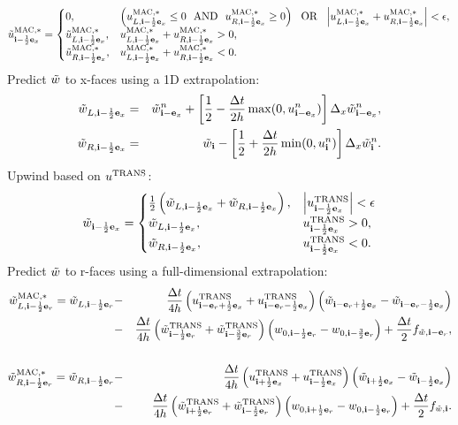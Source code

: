 \begin{equation}
\tilde{u}_{{\bf i}-\frac{1}{2}{\bf e}_x}^{\rm MAC,*} =
\begin{cases}
0, & \left(u_{L,{\bf i}-\frac{1}{2}{\bf e}_x}^{\rm MAC,*} \le 0 ~~ {\rm AND} ~~ u_{R,{\bf i}-\frac{1}{2}{\bf e}_x}^{\rm MAC,*} \ge 0\right) ~~ {\rm OR} ~~ \left|u_{L,{\bf i}-\frac{1}{2}{\bf e}_x}^{\rm MAC,*} + u_{R,{\bf i}-\frac{1}{2}{\bf e}_x}^{\rm MAC,*}\right| < \epsilon, \\
\tilde{u}_{L,{\bf i}-\frac{1}{2}{\bf e}_x}^{\rm MAC,*}, & u_{L,{\bf i}-\frac{1}{2}{\bf e}_x}^{\rm MAC,*} + u_{R,{\bf i}-\frac{1}{2}{\bf e}_x}^{\rm MAC,*} > 0, \\
\tilde{u}_{R,{\bf i}-\frac{1}{2}{\bf e}_x}^{\rm MAC,*}, & u_{L,{\bf i}-\frac{1}{2}{\bf e}_x}^{\rm MAC,*} + u_{R,{\bf i}-\frac{1}{2}{\bf e}_x}^{\rm MAC,*} < 0. 
\end{cases}
\end{equation}
Predict $\tilde{w}$ to x-faces using a 1D extrapolation:
\begin{eqnarray}
\tilde{w}_{L,{\bf i}-\frac{1}{2}{\bf e}_x} &=& \tilde{w}_{{\bf i}-{\bf e}_x}^n + \left[\frac{1}{2} - \frac{\Delta t}{2h}\max(0,u_{{\bf i}-{\bf e}_x}^n)\right]\Delta_x \tilde{w}_{{\bf i}-{\bf e}_x}^n, \\
\tilde{w}_{R,{\bf i}-\frac{1}{2}{\bf e}_x} &=& \tilde{w}_{{\bf i}} - \left[\frac{1}{2} + \frac{\Delta t}{2h}\min(0,u_{{\bf i}}^n)\right]\Delta_x \tilde{w}_{{\bf i}}^n.
\end{eqnarray}
Upwind based on $u^{\rm TRANS}$:
\begin{equation}
\tilde{w}_{{\bf i}-\frac{1}{2}{\bf e}_x} =
\begin{cases}
\frac{1}{2}\left(\tilde{w}_{L,{\bf i}-\frac{1}{2}{\bf e}_x} + \tilde{w}_{R,{\bf i}-\frac{1}{2}{\bf e}_x}\right), & \left|u^{\rm TRANS}_{{\bf i}-\frac{1}{2}{\bf e}_x}\right| < \epsilon \\
\tilde{w}_{L,{\bf i}-\frac{1}{2}{\bf e}_x}, & u^{\rm TRANS}_{{\bf i}-\frac{1}{2}{\bf e}_x} > 0, \\
\tilde{w}_{R,{\bf i}-\frac{1}{2}{\bf e}_x}, & u^{\rm TRANS}_{{\bf i}-\frac{1}{2}{\bf e}_x} < 0. \\
\end{cases}
\end{equation}
Predict $\tilde{w}$ to r-faces using a full-dimensional extrapolation:
\begin{eqnarray}
\tilde{w}_{L,{\bf i}-\frac{1}{2}{\bf e}_r}^{\rm MAC,*} = \tilde{w}_{L,{\bf i}-\frac{1}{2}{\bf e}_r} &-& \frac{\Delta t}{4h}\left(u_{{\bf i}-{\bf e}_r+\frac{1}{2}{\bf e}_x}^{\rm TRANS}+u_{{\bf i}-{\bf e}_r-\frac{1}{2}{\bf e}_x}^{\rm TRANS}\right)\left(\tilde{w}_{{\bf i}-{\bf e}_r+\frac{1}{2}{\bf e}_x} - \tilde{w}_{{\bf i}-{\bf e}_r-\frac{1}{2}{\bf e}_x}\right) \nonumber \\
&-& \frac{\Delta t}{4h}\left(\tilde{w}_{{\bf i}-\frac{1}{2}{\bf e}_r}^{\rm TRANS}+\tilde{w}_{{\bf i}-\frac{3}{2}{\bf e}_r}^{\rm TRANS}\right)\left(w_{0,{\bf i}-\frac{1}{2}{\bf e}_r} - w_{0,{\bf i}-\frac{3}{2}{\bf e}_r}\right) + \frac{\Delta t}{2}f_{\tilde{w},{\bf i}-{\bf e}_r}, \nonumber \\
&& \\
\tilde{w}_{R,{\bf i}-\frac{1}{2}{\bf e}_r}^{\rm MAC,*} = \tilde{w}_{R,{\bf i}-\frac{1}{2}{\bf e}_r} &-& \frac{\Delta t}{4h}\left(u_{{\bf i}+\frac{1}{2}{\bf e}_x}^{\rm TRANS}+u_{{\bf i}-\frac{1}{2}{\bf e}_x}^{\rm TRANS}\right)\left(\tilde{w}_{{\bf i}+\frac{1}{2}{\bf e}_x} - \tilde{w}_{{\bf i}-\frac{1}{2}{\bf e}_x}\right) \nonumber \\
&-& \frac{\Delta t}{4h}\left(\tilde{w}_{{\bf i}+\frac{1}{2}{\bf e}_r}^{\rm TRANS}+\tilde{w}_{{\bf i}-\frac{1}{2}{\bf e}_r}^{\rm TRANS}\right)\left(w_{0,{\bf i}+\frac{1}{2}{\bf e}_r} - w_{0,{\bf i}-\frac{1}{2}{\bf e}_r}\right) + \frac{\Delta t}{2}f_{\tilde{w},{\bf i}}.
\end{eqnarray}
